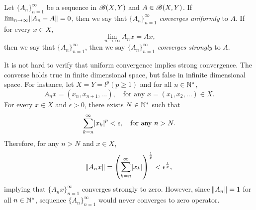 \begin{defn}
Let $\{ A_n \}_{n=1}^{\infty}$ be a sequence in $\mathscr{B}(X, Y)$ and $A \in 
\mathscr{B}(X, Y)$. 
If $\lim_{n \to \infty} \norm{A_n - A} = 0$, then we say that $\{ A_n \}
_{n=1}^{\infty}$ \emph{converges uniformly} to $A$. 
If for every $x \in X$, 
\begin{equation*}
    \lim_{n \to \infty} A_n x = Ax, 
\end{equation*}
then we say that $\{ A_n \}_{n=1}^{\infty}$, then we say $\{ A_n \}
_{n=1}^{\infty}$ \emph{converges strongly} to $A$. 
\end{defn}
\begin{rmk}
It is not hard to verify that uniform convergence implies strong convergence. 
The converse holds true in finite dimensional space, but false in infinite 
dimensional space. 
For instance, let $X = Y = l^p (p \ge 1)$ and for all $n \in \mathbb{N}^\ast$, 
\begin{equation*}
    A_n x = (x_n, x_{n+1}, \ldots), \quad 
    \text{for any } x = (x_1, x_2, \ldots) \in X. 
\end{equation*}
For every $x \in X$ and $\epsilon > 0$, there exists $N \in \mathbb{N}^\ast$ 
such that 
\begin{equation*}
    \sum_{k = n}^{\infty} \abs{x_k}^p < \epsilon, \quad 
    \text{for any } n > N. 
\end{equation*}
Therefore, for any $n > N$ and $x \in X$, 
\begin{equation*}
    \norm{A_nx} = \left( \sum_{k = n}^{\infty} \abs{x_k} \right)^\frac{1}{p} 
    < \epsilon ^\frac{1}{p}, 
\end{equation*}
implying that $\{ A_n x \}_{n=1}^{\infty}$ converges strongly to zero. 
However, since $\norm{A_n} = 1$ for all $n \in \mathbb{N}^\ast$, sequence 
$\{ A_n \}_{n=1}^{\infty}$ would never converges to zero operator. 
\end{rmk}


